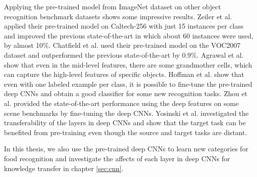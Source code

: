 Applying the pre-trained model from ImageNet dataset on other object recognition benchmark datasets shows some impressive results. Zeiler et al.  \cite{zeiler2014visualizing} applied their pre-trained model on Caltech-256 with just 15 instances per class and improved the previous state-of-the-art in which about 60 instances were used, by almost 10\%.
Chatfield et al.  \cite{Chatfield14} used their pre-trained model on the VOC2007 dataset and outperformed the previous state-of-the-art by 0.9\%.
Agrawal et al. \cite{agrawal2014analyzing} show that even in the mid-level features, there are some grandmother cells, which can capture the high-level features of specific objects. Hoffman et al. \cite{hoffman2013one} show that even with one labeled example per class, it is possible to fine-tune the pre-trained deep CNNs and obtain a good classifier for some new recognition tasks. Zhou et al. \cite{NIPS2014_Zhou} provided the state-of-the-art performance using the deep features on some scene benchmarks by fine-tuning the deep CNNs. Yosinski et al. \cite{yosinski2014transferable} investigated the transferability of the layers in deep CNNs and show that the target task can be benefited from pre-training even though the source and target tasks are distant. 

In this thesis, we also use the pre-trained deep CNNs to learn new categories for food recognition and investigate the affects of each layer in deep CNNs for knowledge transfer in chapter \ref{sec:cnn}.